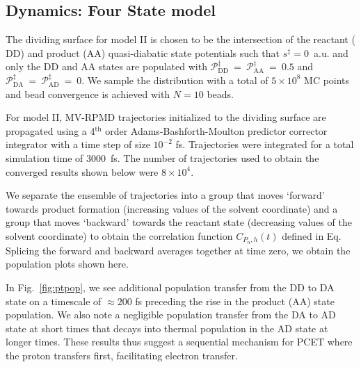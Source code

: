 \documentclass[phd,tocprelim]{cornell}
\begin{document}
\subsection{Dynamics: Four State model}
The dividing surface for model II is 
chosen to be the intersection of the reactant 
($\textrm{DD}$) and product ($\textrm{AA}$) quasi-diabatic 
state potentials such that $s^\ddag=0$~a.u.
and only the $\textrm{DD}$ and $\textrm{AA}$ states are 
populated with 
$\mathcal P_{\textrm{DD}}^\ddagger~=~\mathcal P_{\textrm{AA}}^\ddag~=~0.5$ and 
$\mathcal P_{\textrm{DA}}^\ddag~=~\mathcal P_{\textrm{AD}}^\ddag~=~0$.
We sample the distribution
with a total of $5\times 10^8$ MC points 
and bead convergence is achieved with $N=10$ beads.

For model II, MV-RPMD trajectories initialized
to the dividing surface are propagated 
using a 4$^\textrm{th}$ order Adams-Bashforth-Moulton predictor
corrector integrator with a time step of size $10^{-2}$ fs.
Trajectories were integrated for a total simulation
time of  $3000$~fs. 
The number of trajectories used to obtain the converged results
shown below were $8\times 10^4$.

We separate the ensemble of trajectories
into a group that moves `forward' towards product
formation (increasing values of the solvent coordinate)
and a group that moves `backward' towards the reactant state 
(decreasing values of the solvent coordinate) to obtain
the correlation function $C_{P_n,h}(t)$ 
defined in Eq. Splicing the forward and 
backward averages together at time zero, we obtain the 
population plots shown here.



In Fig.~\ref{fig:ptpop}, we see additional 
population transfer from the DD to DA state 
on a timescale of $\approx 200$ fs preceding
the rise in the product (AA) state population. 
We also note a negligible population transfer from
the DA to AD state at short times that decays into 
thermal population in the AD state at longer times. 
These results thus suggest a sequential
mechanism for PCET where the proton transfers first, 
facilitating electron transfer.
\end{document}
